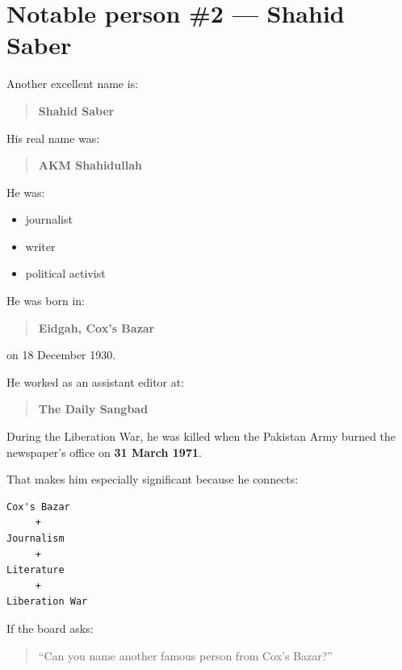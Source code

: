 \medskip

\section{Notable person \#2 --- Shahid Saber}

Another excellent name is:

\begin{quote}
\textbf{Shahid Saber}\\
\end{quote}

His real name was:

\begin{quote}
\textbf{AKM Shahidullah}\\
\end{quote}

He was:

\begin{itemize}
  \item journalist
  \item writer
  \item political activist
\end{itemize}

He was born in:

\begin{quote}
\textbf{Eidgah, Cox's Bazar}\\
\end{quote}

on 18 December 1930.

He worked as an assistant editor at:

\begin{quote}
\textbf{The Daily Sangbad}\\
\end{quote}

During the Liberation War, he was killed when the Pakistan Army burned the newspaper's office on \textbf{31 March 1971}.

That makes him especially significant because he connects:

\begin{lstlisting}
Cox's Bazar
     +
Journalism
     +
Literature
     +
Liberation War
\end{lstlisting}

If the board asks:

\begin{quote}
``Can you name another famous person from Cox's Bazar?''\\
\end{quote}


